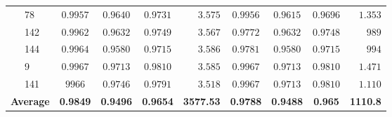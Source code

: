 \begin{table}
\begin{tabular}{ll|cccr|cccr}
        & 78 & $0.9957$ & $0.9640$ & $0.9731$ & $3.575$ & $0.9956$ & $0.9615$ & $0.9696$ & $1.353$\\
        & 142 & $0.9962$ & $0.9632$ & $0.9749$ & $3.567$ & $0.9772$ & $0.9632$ & $0.9748$ & $989$\\
        & 144 & $0.9964$ & $0.9580$ & $0.9715$ & $3.586$ & $0.9781$ & $0.9580$ & $0.9715$ & $994$\\
        & 9 & $0.9967$ & $0.9713$ & $0.9810$ & $3.585$ & $0.9967$ & $0.9713$ & $0.9810$ & $1.471$\\
        & 141 & $9966$ & $0.9746$ & $0.9791$ & $3.518$ & $0.9967$ & $0.9713$ & $0.9810$ & $1.110$\\
        \cmidrule{1-10}
        \multicolumn{2}{r|}{\textbf{Average}} & \textbf{0.9849} & \textbf{0.9496} & \textbf{0.9654} & \textbf{3577.53} & \textbf{0.9788} & \textbf{0.9488} & \textbf{0.965} & \textbf{1110.8}\\
        \bottomrule
    \end{tabular}
\end{table}
\renewcommand{\arraystretch}{1}

